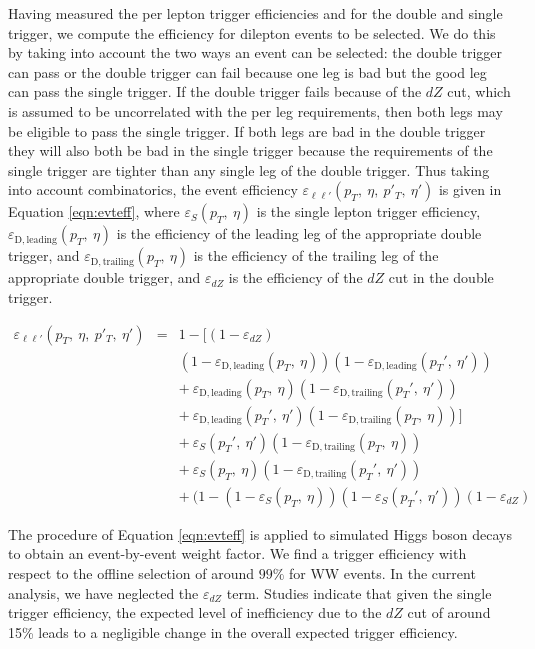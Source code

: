 Having measured the per lepton trigger efficiencies 
and for the double and single trigger,
we compute the efficiency for dilepton events to be selected.
We do this by taking into account the two ways an event can be selected: 
the double trigger can pass or the double trigger can fail because one leg is bad
but the good leg can pass the single trigger.  If the double trigger fails
because of the $dZ$ cut, which is assumed to be uncorrelated with the per leg requirements,
then both legs may be eligible to pass the single trigger. 
If both legs are bad in the double trigger they will also both be bad in the single trigger
because the requirements of the single trigger are tighter than any single leg of the double trigger.
Thus taking into account combinatorics, the event efficiency $\varepsilon_{\ell\ell'}(p_T,\:\eta,\:p'_T,\:\eta')$
is given in Equation \ref{eqn:evteff}, where $\varepsilon_{S}(p_T,\:\eta)$ is the single 
lepton trigger efficiency,
$\varepsilon_{\mathrm{D,leading}}(p_T,\:\eta)$ is the efficiency of the leading leg of the 
appropriate double trigger, and $\varepsilon_{\mathrm{D,trailing}}(p_T,\:\eta)$ is the 
efficiency of the trailing leg of the appropriate double trigger, and $\varepsilon_{dZ}$ is the efficiency
of the $dZ$ cut in the double trigger.

\begin{eqnarray}
\label{eqn:evteff}
\varepsilon_{\ell\ell'}(p_T,\:\eta,\:p'_T,\:\eta') & = & 1 - [(1-\varepsilon_{dZ}) \\
               &   & (1-\varepsilon_{\mathrm{D,leading}}(p_T,\:\eta))(1-\varepsilon_{\mathrm{D,leading}}(p_T',\:\eta')) \\
               &   & +~\varepsilon_{\mathrm{D,leading}}(p_T,\:\eta)(1-\varepsilon_{\mathrm{D,trailing}}(p_T',\:\eta')) \\
               &   & +~\varepsilon_{\mathrm{D,leading}}(p_T',\:\eta')(1-\varepsilon_{\mathrm{D,trailing}}(p_T,\:\eta))] \\
               &   & +~\varepsilon_{S}(p_T',\:\eta')(1-\varepsilon_{\mathrm{D,trailing}}(p_T,\:\eta)) \nonumber\\
               &   & +~\varepsilon_{S}(p_T,\:\eta)(1-\varepsilon_{\mathrm{D,trailing}}(p_T',\:\eta')) \\
               &   & +~(1-(1-\varepsilon_{S}(p_T,\:\eta))(1-\varepsilon_{S}(p_T',\:\eta'))(1-\varepsilon_{dZ})
\end{eqnarray}

The procedure of Equation \ref{eqn:evteff} is applied to simulated Higgs boson decays to obtain an event-by-event weight factor. We find a 
trigger efficiency with respect to the offline selection of around $99\%$ for WW events.
In the current analysis, we have neglected the $\varepsilon_{dZ}$ term.  Studies indicate that given the single trigger efficiency,
the expected level of inefficiency due to the $dZ$ cut of around 15\% leads to a negligible change in the overall expected trigger efficiency.

